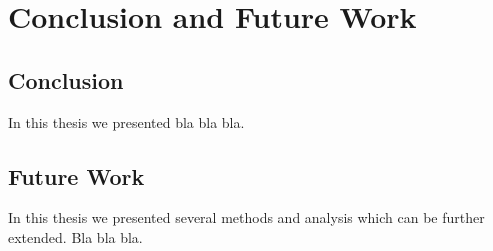 \chapter{Conclusion and Future Work}

\section{Conclusion}
In this thesis we presented bla bla bla.

\section{Future Work}
In this thesis we presented several methods and analysis which can be further extended. Bla bla bla.
